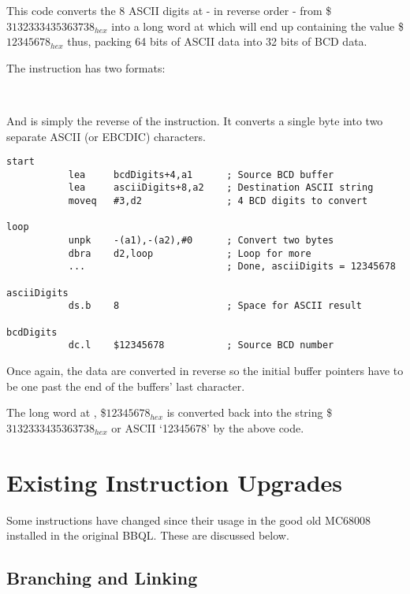 This code converts the 8 ASCII digits at  - in reverse order - from \$$3132333435363738_{hex}$ into a long word at  which will end up containing the value \$$12345678_{hex}$ thus, packing 64 bits of ASCII data into 32 bits of BCD data.

The  instruction has two formats:

\\

And is simply the reverse of the  instruction. It converts a single byte into two separate ASCII (or EBCDIC) characters.

\begin{lstlisting}[firstnumber=1,caption={Example of the UNPK instruction}]
start
           lea     bcdDigits+4,a1      ; Source BCD buffer
           lea     asciiDigits+8,a2    ; Destination ASCII string
           moveq   #3,d2               ; 4 BCD digits to convert

loop
           unpk    -(a1),-(a2),#0      ; Convert two bytes
           dbra    d2,loop             ; Loop for more
           ...                         ; Done, asciiDigits = 12345678

asciiDigits
           ds.b    8                   ; Space for ASCII result

bcdDigits
           dc.l    $12345678           ; Source BCD number
\end{lstlisting}

Once again, the data are converted in reverse so the initial buffer pointers have to be one past the end of the buffers' last character.

The long word at , \$$12345678_{hex}$ is converted back into the  string \$$3132333435363738_{hex}$ or ASCII `12345678' by the above code.

\section{Existing Instruction Upgrades}

Some instructions have changed since their usage in the good old MC68008 installed in the original BBQL. These are discussed below.

\subsection{Branching and Linking}

